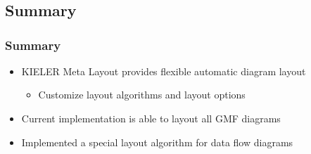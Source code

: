 \section*{}

\subsection{Summary}
\begin{frame}
  \frametitle{Summary}
    \begin{itemize}
    \item<1-> KIELER Meta Layout provides flexible automatic diagram layout
      \begin{itemize}
        \item Customize layout algorithms and layout options
      \end{itemize}
    \item<2-> Current implementation is able to layout all GMF diagrams
    \item<3-> Implemented a special layout algorithm for data flow diagrams
  \end{itemize}
\end{frame}
